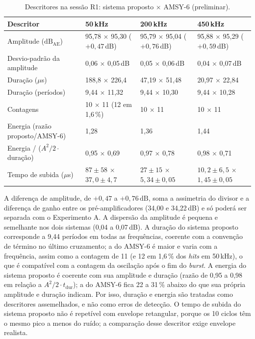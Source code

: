 \begin{table}[htbp]
	\centering
	\footnotesize
		\caption{Descritores na sessão R1: sistema proposto \(\times\) AMSY-6 (preliminar).}
	\label{v2:tab:descritores_r1}
	\begin{tabular}{|p{}|p{}|p{}|p{}|}
		\hline
		\textbf{Descritor} & \textbf{50\,kHz} & \textbf{200\,kHz} & \textbf{450\,kHz} \\
		\hline
		Amplitude (\(\mathrm{dB}_{\mathrm{AE}}\)) & 95,78 \(\times\) 95,30 (\(+0{,}47\)\,dB) & 95,79 \(\times\) 95,04 (\(+0{,}76\)\,dB) & 95,88 \(\times\) 95,29 (\(+0{,}59\)\,dB) \\
		\hline
		Desvio-padrão da amplitude & 0,06 \(\times\) 0,05\,dB & 0,05 \(\times\) 0,06\,dB & 0,04 \(\times\) 0,07\,dB \\
		\hline
		Duração (\(\mu\)s) & 188,8 \(\times\) 226,4 & 47,19 \(\times\) 51,48 & 20,97 \(\times\) 22,84 \\
		\hline
		Duração (períodos) & 9,44 \(\times\) 11,32 & 9,44 \(\times\) 10,30 & 9,44 \(\times\) 10,28 \\
		\hline
		Contagens & 10 \(\times\) 11 (12 em 1,6\,\%) & 10 \(\times\) 11 & 10 \(\times\) 11 \\
		\hline
		Energia (razão proposto/AMSY-6) & 1,28 & 1,36 & 1,44 \\
		\hline
		Energia / (\(A^2/2 \cdot\) duração) & 0,95 \(\times\) 0,69 & 0,97 \(\times\) 0,78 & 0,98 \(\times\) 0,71 \\
		\hline
		Tempo de subida (\(\mu\)s) & \(87 \pm 58\) \(\times\) \(37{,}0 \pm 4{,}7\) & \(27 \pm 15\) \(\times\) \(5{,}34 \pm 0{,}05\) & \(10{,}2 \pm 6{,}5\) \(\times\) \(1{,}45 \pm 0{,}05\) \\
		\hline
	\end{tabular}
\end{table}

A diferença de amplitude, de \(+0{,}47\) a \(+0{,}76\,\mathrm{dB}\), soma a assimetria do divisor e a diferença de ganho entre os pré-amplificadores (34,00 e 34,22\,dB) e só poderá ser separada com o Experimento A. A dispersão da amplitude é pequena e semelhante nos dois sistemas (0,04 a 0,07\,dB). A duração do sistema proposto corresponde a 9,44 períodos em todas as frequências, coerente com a convenção de término no último cruzamento; a do AMSY-6 é maior e varia com a frequência, assim como a contagem de 11 (e 12 em 1,6\,\% dos \textit{hits} em 50\,kHz), o que é compatível com a contagem da oscilação após o fim do \textit{burst}. A energia do sistema proposto é coerente com sua amplitude e duração (razão de 0,95 a 0,98 em relação a \(A^2/2 \cdot t_{\mathrm{dur}}\)); a do AMSY-6 fica 22 a 31\,\% abaixo do que sua própria amplitude e duração indicam. Por isso, duração e energia são tratadas como descritores assemelhados, e não como erros de detecção. O tempo de subida do sistema proposto não é repetível com envelope retangular, porque os 10 ciclos têm o mesmo pico a menos do ruído; a comparação desse descritor exige envelope realista.

